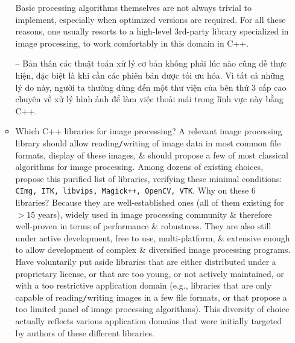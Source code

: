\documentclass{article}
\begin{document}
\begin{itemize}
\begin{itemize}
        Basic processing algorithms themselves are not always trivial to implement, especially when optimized versions are required. For all these reasons, one usually resorts to a high-level 3rd-party library specialized in image processing, to work comfortably in this domain in C++.
        
        -- Bản thân các thuật toán xử lý cơ bản không phải lúc nào cũng dễ thực hiện, đặc biệt là khi cần các phiên bản được tối ưu hóa. Vì tất cả những lý do này, người ta thường dùng đến một thư viện của bên thứ 3 cấp cao chuyên về xử lý hình ảnh để làm việc thoải mái trong lĩnh vực này bằng C++.        
        \item {\sf Which C++ libraries for image processing?} A relevant image processing library should allow reading{\tt/}writing of image data in most common file formats, display of these images, \& should propose a few of most classical algorithms for image processing. Among dozens of existing choices, propose this purified list of libraries, verifying these minimal conditions: {\tt CImg, ITK, libvips, Magick++, OpenCV, VTK}. Why on these 6 libraries? Because they are well-established ones (all of them existing for $> 15$ years), widely used in image processing community \& therefore well-proven in terms of performance \& robustness. They are also still under active development, free to use, multi-platform, \& extensive enough to allow development of complex \& diversified image processing programs. Have voluntarily put aside libraries that are either distributed under a proprietary license, or that are too young, or not actively maintained, or with a too restrictive application domain (e.g., libraries that are only capable of reading{\tt/}writing images in a few file formats, or that propose a too limited panel of image processing algorithms). This diversity of choice actually reflects various application domains that were initially targeted by authors of these different libraries.
        

\end{itemize}
\end{itemize}
\end{document}
